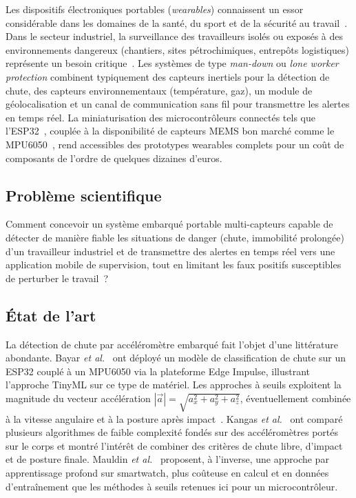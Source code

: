 \documentclass[12pt,a4paper]{article}
\renewcommand{\_}{\textunderscore\allowbreak}
\begin{document}
Les dispositifs électroniques portables (\textit{wearables}) connaissent un essor considérable dans les domaines de la santé, du sport et de la sécurité au travail~\cite{ref_wearable_survey}. Dans le secteur industriel, la surveillance des travailleurs isolés ou exposés à des environnements dangereux (chantiers, sites pétrochimiques, entrepôts logistiques) représente un besoin critique~\cite{ref_lone_worker}. Les systèmes de type \textit{man-down} ou \textit{lone worker protection} combinent typiquement des capteurs inertiels pour la détection de chute, des capteurs environnementaux (température, gaz), un module de géolocalisation et un canal de communication sans fil pour transmettre les alertes en temps réel. La miniaturisation des microcontrôleurs connectés tels que l'ESP32~\cite{ref_esp32_datasheet}, couplée à la disponibilité de capteurs MEMS bon marché comme le MPU6050~\cite{ref_mpu6050_datasheet}, rend accessibles des prototypes wearables complets pour un coût de composants de l'ordre de quelques dizaines d'euros.

\subsection{Problème scientifique}

Comment concevoir un système embarqué portable multi-capteurs capable de détecter de manière fiable les situations de danger (chute, immobilité prolongée) d'un travailleur industriel et de transmettre des alertes en temps réel vers une application mobile de supervision, tout en limitant les faux positifs susceptibles de perturber le travail~?

\subsection{État de l'art}

La détection de chute par accéléromètre embarqué fait l'objet d'une littérature abondante. Bayar \textit{et al.}~\cite{ref_bayar2023} ont déployé un modèle de classification de chute sur un ESP32 couplé à un MPU6050 via la plateforme Edge Impulse, illustrant l'approche TinyML sur ce type de matériel. Les approches à seuils exploitent la magnitude du vecteur accélération $|\vec{a}| = \sqrt{a_x^2 + a_y^2 + a_z^2}$, éventuellement combinée à la vitesse angulaire et à la posture après impact~\cite{ref_fall_detection_threshold}. Kangas \textit{et al.}~\cite{ref_kangas} ont comparé plusieurs algorithmes de faible complexité fondés sur des accéléromètres portés sur le corps et montré l'intérêt de combiner des critères de chute libre, d'impact et de posture finale. Mauldin \textit{et al.}~\cite{ref_mauldin} proposent, à l'inverse, une approche par apprentissage profond sur smartwatch, plus coûteuse en calcul et en données d'entraînement que les méthodes à seuils retenues ici pour un microcontrôleur.
\end{document}
